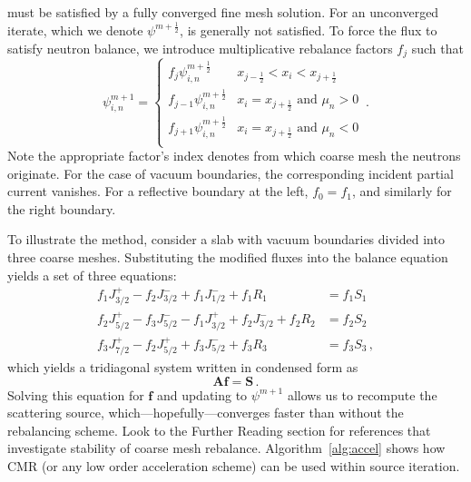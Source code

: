  must be satisfied by a fully converged fine mesh 
solution.  For an unconverged iterate, which we denote $\psi^{m+\frac{1}{2}}$, 
 is generally not satisfied.  To force the flux to 
satisfy neutron balance, we introduce multiplicative rebalance factors $f_j$ 
such that
\begin{equation}
 \psi^{m+1}_{i,n} =
 \begin{cases} f_j \psi^{m+\frac{1}{2}}_{i,n}     &   x_{j-\frac{1}{2}} < x_{i} 
< x_{j+\frac{1}{2}} \\
               f_{j-1} \psi^{m+\frac{1}{2}}_{i,n} &   x_{i} = x_{j+\frac{1}{2}} 
\text{ and } \mu_n > 0 \\
               f_{j+1} \psi^{m+\frac{1}{2}}_{i,n} &   x_{i} = x_{j+\frac{1}{2}} 
\text{ and } \mu_n < 0 \\
 \end{cases} \, .
 \label{eq:alpha}
\end{equation}
Note the appropriate factor's index denotes from which coarse mesh the neutrons 
originate. For the case of vacuum boundaries, the corresponding incident partial 
current vanishes.  For a reflective boundary at the left, $f_0 = f_1$, and 
similarly for the right boundary.

To illustrate the method, consider a slab with vacuum boundaries divided into 
three coarse meshes.  Substituting the modified fluxes into the balance equation 
yields a set of three equations:
\begin{equation}
\begin{split}
  f_1 J^+_{3/2}  - f_2 J^{-}_{3/2}                   + f_1 J^{-}_{1/2} + f_1 R_1 
&= f_1 S_1 \\
  f_2 J^+_{5/2}  - f_3 J^{-}_{5/2} - f_1 J^{+}_{3/2} + f_2 J^{-}_{3/2} + f_2 R_2 
&= f_2 S_2 \\
  f_3 J^+_{7/2}                    - f_2 J^{+}_{5/2} + f_3 J^{-}_{5/2} + f_3 R_3 
&= f_3 S_3 \, ,
\end{split}
\end{equation}
which yields a tridiagonal system written in condensed form as
\begin{equation}
 \mathbf{A} \mathbf{f} = \mathbf{S} \, .
\end{equation}
Solving this equation for $\mathbf{f}$ and updating to $\psi^{m+1}$ allows us to 
recompute the scattering source, which---hopefully---converges faster than 
without the rebalancing scheme.  Look to the Further Reading section for 
references that investigate stability of coarse mesh rebalance.  
Algorithm~\ref{alg:accel} shows how CMR (or any low order acceleration scheme) 
can be used within source iteration.

